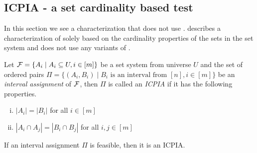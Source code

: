



\subsection{ICPIA - a set cardinality based \COP test}
\label{sec:icpiasurvey}
In this section we see a characterization that does not use
\PQtree. \cite{nsnrs09} describes a characterization of \cop solely
based on the cardinality properties of the sets in the set system and
does not use any variants of \PQtrees.

\begin{definition}
  \label{def:icpia}
  Let ${\cal F} = \{A_i \mid A_i \subseteq U, i \in [m]\}$ be a set system
  from universe $U$ and the set of ordered pairs $\Pi = \{(A_i, B_i)
  \mid B_i  \text{ is an interval from } [n], i \in [m]\}$ be an {\em interval
    assignment} of ${\cal F}$, then $\Pi$ is called an {\em ICPIA} if it has
  the following properties.
  \begin{enumerate}[i.]
  \item $|A_i| = |B_i|$ for all $i \in [m]$
  \item $|A_i \cap A_j| = |B_i \cap B_j|$ for all $i, j \in [m]$
  \end{enumerate}
\end{definition}

\begin{theoremsansproof}
  \label{th:icpia1}
  If an interval assignment $\Pi$ is feasible, then it is an ICPIA.
\end{theoremsansproof}

